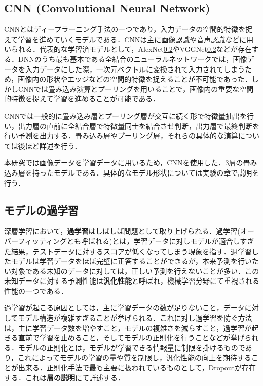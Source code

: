 \documentclass[a4j, 11pt]{jreport}
\begin{document}
\subsection{CNN (Convolutional Neural Network)}
CNNとはディープラーニング手法の一つであり，入力データの空間的特徴を捉えて学習を進めていくモデルである．CNNは主に画像認識や音声認識などに用いられる．代表的な学習済モデルとして，AlexNet\ref{}やVGGNet\ref{}などが存在する．DNNのうち最も基本である全結合のニューラルネットワークでは，画像データを入力データにした際，一次元ベクトルに変換されて入力されてしまうため，画像内の形状やエッジなどの空間的特徴を捉えることが不可能であった．しかしCNNでは畳み込み演算とプーリングを用いることで，画像内の重要な空間的特徴を捉えて学習を進めることが可能である．

CNNでは一般的に畳み込み層とプーリング層が交互に続く形で特徴量抽出を行い，出力層の直前に全結合層で特徴量同士を結合させ判断，出力層で最終判断を行い予測を出力する．畳み込み層やプーリング層，それらの具体的な演算については後ほど詳述を行う．

本研究では画像データを学習データに用いるため，CNNを使用した．3層の畳み込み層を持ったモデルである．具体的なモデル形状については実験の章で説明を行う．

\subsection{モデルの過学習}
深層学習において，\textbf{過学習}はしばしば問題として取り上げられる．過学習(オーバーフィッティングとも呼ばれる)とは，学習データに対しモデルが適合しすぎた結果，テストデータに対するスコアが低くなってしまう現象を指す．過学習したモデルは学習データをほぼ完璧に正答することができるが，本来予測を行いたい対象である未知のデータに対しては，正しい予測を行えないことが多い．この未知データに対する予測性能は\textbf{汎化性能}と呼ばれ，機械学習分野にて重視される性能の一つである．

過学習が起こる原因としては，主に学習データの数が足りないこと，データに対してモデル構造が複雑すぎることが挙げられる．これに対し過学習を防ぐ方法は，主に学習データ数を増やすこと，モデルの複雑さを減らすこと，過学習が起きる直前で学習を止めること，そしてモデルの正則化を行うことなどが挙げられる．モデルの正則化とは，モデルが学習できる情報量に制限を掛けるものであり，これによってモデルの学習の量や質を制限し，汎化性能の向上を期待することが出来る．正則化手法で最も主要に扱われているものとして，Dropout\cite{Srivastava2014}が存在する．これは\textbf{層の説明}にて詳述する．
\end{document}
